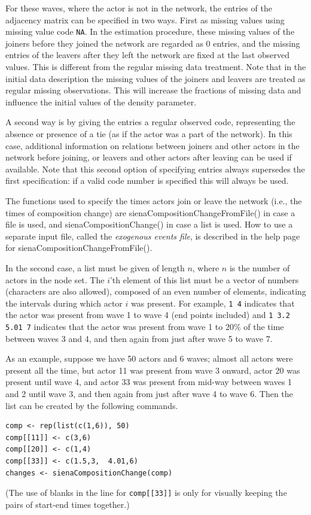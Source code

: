 \documentclass[a4paper,fleqn,11pt]{article}
\newcommand{\+}{\, + \,}
\newcommand{\sfn}[1]{\textsf{#1}}
\begin{document}
For these waves, where the actor is not in the network, the entries
of the adjacency matrix can be specified in two ways. First as
missing values using missing value code \texttt{NA}. In the estimation
procedure, these missing values of the joiners before they joined
the network are regarded as 0 entries, and the missing entries of
the leavers after they left the network are fixed at the last
observed values. This is different from the regular missing data
treatment. Note that in the initial data description the missing
values of the joiners and leavers are treated as regular missing
observations. This will increase the fractions of missing data and
influence the initial values of the density parameter.

A second way is by giving the entries a regular observed code,
representing the absence or presence of a tie (as
if the actor was a part of the network). In this case, additional
information on relations between joiners and other actors in the
network before joining, or leavers and other actors after leaving
can be used if available. Note that this second option of
specifying entries always supersedes the first specification: if a
valid code number is specified this will always be used.

The functions used to specify the times actors
join or leave the network (i.e., the times of composition change)
are \sfn{sienaCompositionChangeFromFile()} in case a file is used,
and \sfn{sienaCompositionChange()} in case a list is used.
How to use a separate input file,
called the \emph{exogenous events file}, is
described in the help page for \sfn{sienaCompositionChangeFromFile()}.

In the second case, a list must be given of length $n$,
where $n$ is the number of actors in the node set.
The $i$'th element of this list must be a vector of numbers (characters are also allowed),
composed of an even number of elements, indicating the intervals during
which actor $i$ was present. For example, \texttt{1 4} indicates that the actor
was present from wave 1 to wave 4 (end points included) and
\texttt{1 3.2 5.01 7}
indicates that the actor was present from wave 1 to 20\% of the time between
waves 3 and 4, and then again from just after wave 5 to wave 7.

As an example, suppose we have 50 actors and 6 waves;
almost all actors were present all the time, but actor 11 was present
from wave 3 onward, actor 20 was present until wave 4, and
actor 33 was present from mid-way between waves 1 and 2 until wave 3, and then
again from just after wave 4 to wave 6.
Then the list can be created by the following commands.
\begin{verbatim}
comp <- rep(list(c(1,6)), 50)
comp[[11]] <- c(3,6)
comp[[20]] <- c(1,4)
comp[[33]] <- c(1.5,3,  4.01,6)
changes <- sienaCompositionChange(comp)
\end{verbatim}
(The use of blanks in the line for \texttt{comp[[33]]} is only for visually
keeping the pairs of start-end times together.)
\end{document}
